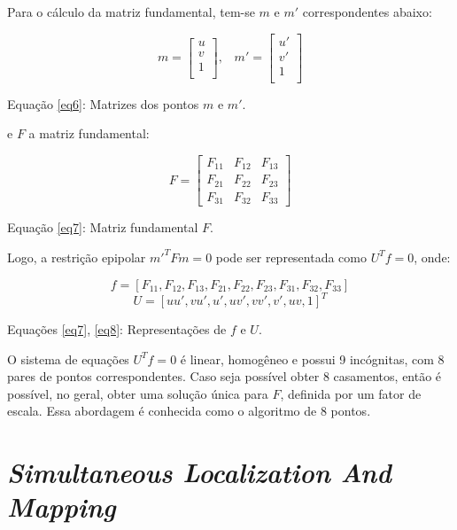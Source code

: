 Para o cálculo da matriz fundamental, tem-se $m$ e $m'$ correspondentes abaixo:

\begin{equation}\label{eq6}
m = \begin{bmatrix}u\\v\\1\\ \end{bmatrix}, \; \; \;
m' = \begin{bmatrix}u'\\v'\\1\\ \end{bmatrix}
\end{equation}

Equação \eqref{eq6}: Matrizes dos pontos $m$ e $m'$.

e $F$ a matriz fundamental:

\begin{equation}\label{eq7}
F = 
\begin{bmatrix}
	F_{11} &  F_{12} &  F_{13}\\
	F_{21} &  F_{22} &  F_{23}\\
	F_{31} &  F_{32} &  F_{33}
\end{bmatrix}
\end{equation}

Equação \eqref{eq7}: Matriz fundamental $F$.

Logo, a restrição epipolar $m'^{T}Fm = 0$ pode ser representada como $U^{T}f = 0$, onde:

\begin{equation}\label{eq8}
f = [F_{11}, F_{12}, F_{13}, F_{21}, F_{22}, F_{23}, F_{31}, F_{32}, F_{33}]
\end{equation}
\begin{equation}\label{eq9}
U = [uu', vu', u', uv', vv', v', uv,1]^{T}
\end{equation}

Equações \eqref{eq7}, \eqref{eq8}: Representações de $f$ e $U$.

O sistema de equações $U^{T}f = 0$ é linear, homogêneo e possui 9 incógnitas, com 8 pares de pontos correspondentes. Caso seja possível obter 8 casamentos, então é possível, no geral, obter uma solução única para $F$, definida por um fator de escala. Essa abordagem é conhecida como o algoritmo de 8 pontos.

\section{\textit{Simultaneous Localization And Mapping}}

